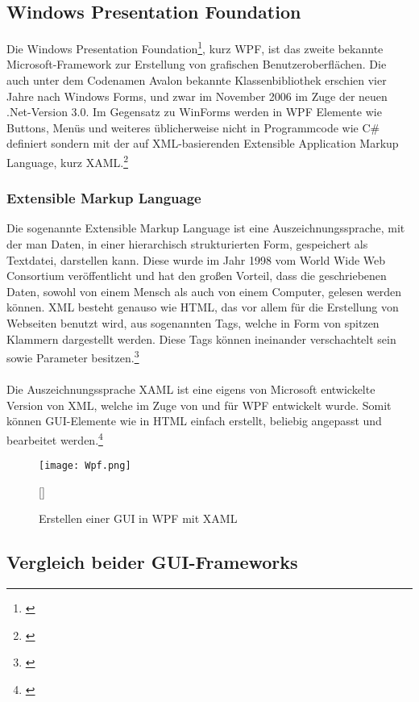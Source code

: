 \subsection{Windows Presentation Foundation}
Die Windows Presentation Foundation\footnote[3]{\cite[Vgl.][]{WPF1}}, kurz WPF, ist das zweite bekannte Microsoft-Framework zur Erstellung von grafischen Benutzeroberflächen. Die auch unter dem Codenamen Avalon bekannte Klassenbibliothek erschien vier Jahre nach Windows Forms, und zwar im November 2006 im Zuge der neuen .Net-Version 3.0. Im Gegensatz zu WinForms werden in WPF Elemente wie Buttons, Menüs und weiteres üblicherweise nicht in Programmcode wie C\# definiert sondern mit der auf XML-basierenden Extensible Application Markup Language, kurz XAML.\footnote[4]{\cite[Vgl.][]{WPF2}}

\subsubsection{Extensible Markup Language}
Die sogenannte Extensible Markup Language ist eine Auszeichnungssprache, mit der man Daten, in einer hierarchisch strukturierten Form, gespeichert als Textdatei, darstellen kann. Diese wurde im Jahr 1998 vom World Wide Web Consortium veröffentlicht und hat den großen Vorteil, dass die geschriebenen Daten, sowohl von einem Mensch als auch von einem Computer, gelesen werden können. XML besteht genauso wie HTML, das vor allem für die Erstellung von Webseiten benutzt wird, aus sogenannten Tags, welche in Form von spitzen Klammern dargestellt werden. Diese Tags können ineinander verschachtelt sein sowie Parameter besitzen.\footnote[1]{\cite[Vgl.][]{XML}}
\\ \ \\
Die Auszeichnungssprache XAML ist eine eigens von Microsoft entwickelte Version von XML, welche im Zuge von und für WPF entwickelt wurde. Somit können GUI-Elemente wie in HTML einfach erstellt, beliebig angepasst und bearbeitet werden.\footnote[2]{\cite[Vgl.][]{XAML1}}
\\
\begin{figure}[H]
    \centering
    \texttt{[image: Wpf.png]}
    \caption[Erstellen einer GUI in WPF mit XAML]{Erstellen einer GUI in WPF mit XAML}[\cite{XAML2}]
\end{figure}

\subsection{Vergleich beider GUI-Frameworks}

